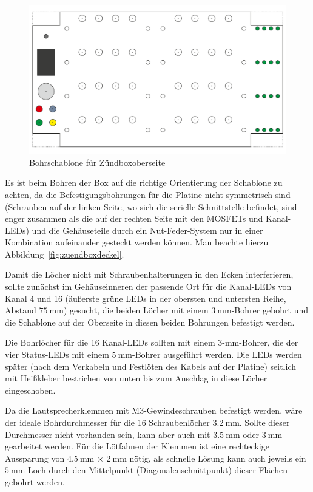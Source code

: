 \documentclass[paper=a4, parskip, numbers=noenddot, toc=listof, headsepline]{scrbook}
\begin{document}
			  \begin{figure}
				  \centering
				  \includegraphics[angle=90,scale=1]{Bilder/Zuendboxbohrschablone}
				  \caption{Bohrschablone für Zündboxoberseite}
				  \label{fig:zuendboxbohren}
			  \end{figure}

			  Es ist beim Bohren der Box auf die richtige Orientierung der Schablone zu achten, da die Befestigungsbohrungen für die Platine nicht symmetrisch sind (Schrauben auf der linken Seite, wo sich die serielle Schnittstelle befindet, sind enger zusammen als die auf der rechten Seite mit den MOSFETs und Kanal-LEDs) und die Gehäuseteile durch ein Nut-Feder-System nur in einer Kombination aufeinander gesteckt werden können. Man beachte hierzu Abbildung~\ref{fig:zuendboxdeckel}.

			  Damit die Löcher nicht mit Schraubenhalterungen in den Ecken interferieren, sollte zunächst im Gehäuseinneren der passende Ort für die Kanal-LEDs von Kanal 4 und 16 (äußerste grüne LEDs in der obersten und untersten Reihe, Abstand $\SI{75}{\milli\metre}$) gesucht, die beiden Löcher mit einem $\SI{3}{\milli\metre}$-Bohrer gebohrt und die Schablone auf der Oberseite in diesen beiden Bohrungen befestigt werden.

			  Die Bohrlöcher für die 16 Kanal-LEDs sollten mit einem 3-mm-Bohrer, die der vier Status-LEDs mit einem $\SI{5}{\milli\metre}$-Bohrer ausgeführt werden. Die LEDs werden später (nach dem Verkabeln und Festlöten des Kabels auf der Platine) seitlich mit Heißkleber bestrichen von unten bis zum Anschlag in diese Löcher eingeschoben.

			  Da die Lautsprecherklemmen mit M3-Gewindeschrauben befestigt werden, wäre der ideale Bohrdurchmesser für die 16 Schraubenlöcher $\SI{3,2}{\milli\metre}$. Sollte dieser Durchmesser nicht vorhanden sein, kann aber auch mit $\SI{3,5}{\milli\metre}$ oder $\SI{3}{\milli\metre}$ gearbeitet werden. Für die Lötfahnen der Klemmen ist eine rechteckige Aussparung von $\SI{4,5}{\milli\metre}\,\times\,\SI{2}{\milli\metre}$ nötig, als schnelle Lösung kann auch jeweils ein $\SI{5}{\milli\metre}$-Loch durch den Mittelpunkt (Diagonalenschnittpunkt) dieser Flächen gebohrt werden.
\end{document}
